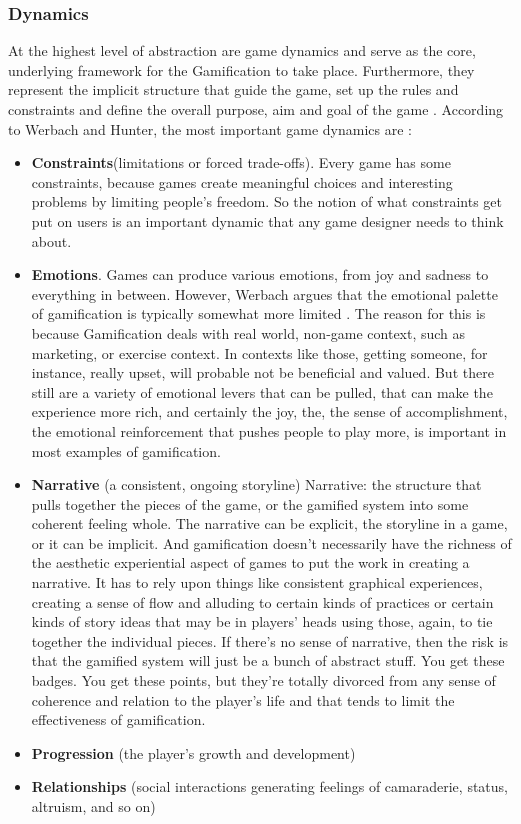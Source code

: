 \subsubsection{Dynamics}
At the highest level of abstraction are game dynamics and serve as the core,  underlying framework for the Gamification to take place. Furthermore, they represent the implicit structure that guide the game, set  up  the  rules and constraints and  define the overall purpose, aim and goal of the game \cite{werbach2012win, WerbachCoursera}. 
According to Werbach and Hunter, the most important game dynamics are \cite{werbach2012win}:
\begin{itemize}
\item \textbf{Constraints}(limitations or forced trade-offs). Every game has some constraints, because games create meaningful choices and interesting problems by limiting people's freedom. So the notion of what constraints get put on users is an important dynamic that any game designer needs to think about. 
\item \textbf{Emotions}. Games can produce various emotions, from joy and sadness to everything in between. However, Werbach argues that the emotional palette of gamification is typically somewhat more limited \cite{WerbachCoursera}. The reason for this is because Gamification deals with real world, non-game context, such as marketing, or exercise context. In contexts like those, getting someone, for instance, really upset, will probable not be beneficial and valued. But there still are a variety of emotional levers that can be pulled, that can make the experience more rich, and certainly the joy, the, the sense of accomplishment, the emotional reinforcement that pushes people to play more, is important in most examples of gamification. 
\item \textbf{Narrative} (a consistent, ongoing storyline) Narrative: the structure that pulls together the pieces of the game, or the gamified system into some coherent feeling whole. The narrative can be explicit, the storyline in a game, or it can be implicit. And gamification doesn't necessarily have the richness of the aesthetic experiential aspect of games to put the work in creating a narrative. It has to rely upon things like consistent graphical experiences, creating a sense of flow and alluding to certain kinds of practices or certain kinds of story ideas that may be in players' heads using those, again, to tie together the individual pieces. If there's no sense of narrative, then the risk is that the gamified system will just be a bunch of abstract stuff. You get these badges. You get these points, but they're totally divorced from any sense of coherence and relation to the player's life and that tends to limit the effectiveness of gamification.
\item \textbf{Progression} (the player's growth and development)
\item \textbf{Relationships} (social interactions generating feelings of camaraderie, status, altruism, and so on)
\end{itemize}
